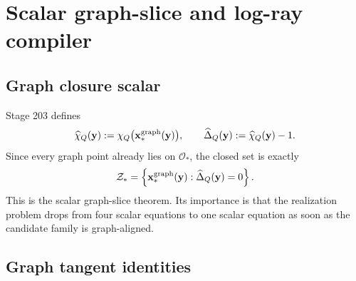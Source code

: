 \section{Scalar graph-slice and log-ray compiler}
\label{sec:app-part06-scalar-graph-slice-and-log-ray-compiler}

\subsection{Graph closure scalar}
\label{subsec:app-part06-graph-closure-scalar}

Stage 203 defines
\begin{equation}
\label{eq:app-part06-chi-hat-def}
\widehat\chi_Q(\mathbf y):=
\chi_Q\bigl(\mathbf x_*^{\rm graph}(\mathbf y)\bigr),
\qquad
\widehat\Delta_Q(\mathbf y):=\widehat\chi_Q(\mathbf y)-1.
\end{equation}
Since every graph point already lies on \(\mathcal O_*\), the closed set is exactly
\begin{equation}
\label{eq:app-part06-Zstar-graph-slice}
\mathcal Z_*
=
\left\{
\mathbf x_*^{\rm graph}(\mathbf y):\widehat\Delta_Q(\mathbf y)=0
\right\}.
\end{equation}
This is the scalar graph-slice theorem.  Its importance is that the realization problem drops from four scalar equations to one scalar equation as soon as the candidate family is graph-aligned.

\subsection{Graph tangent identities}
\label{subsec:app-part06-graph-tangent-identities}


